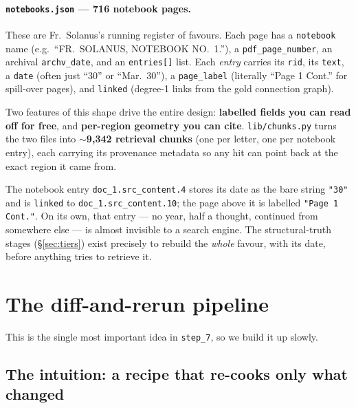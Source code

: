 \documentclass[11pt]{article}
\newcommand{\code}[1]{\texttt{#1}}
\begin{document}
\paragraph{\code{notebooks.json} --- 716 notebook pages.} These are Fr.\ Solanus's running register of
favours. Each page has a \code{notebook} name (e.g.\ ``FR.\ SOLANUS, NOTEBOOK NO.\ 1.''), a
\code{pdf\_page\_number}, an archival \code{archv\_date}, and an \code{entries[]} list. Each
\emph{entry} carries its \code{rid}, its \code{text}, a \code{date} (often just ``30'' or
``Mar.\ 30''), a \code{page\_label} (literally ``Page 1 Cont.'' for spill-over pages), and
\code{linked} (degree-1 links from the gold connection graph).

Two features of this shape drive the entire design: \textbf{labelled fields you can read off for
free}, and \textbf{per-region geometry you can cite}. \code{lib/chunks.py} turns the two files into
$\sim$\textbf{9{,}342 retrieval chunks} (one per letter, one per notebook entry), each carrying its
provenance metadata so any hit can point back at the exact region it came from.

\begin{tcolorbox}[colback=gray!5, colframe=gray!50!black, sharp corners, boxrule=0.5pt,
                  title=\bfseries A concrete entry that explains why half the pipeline exists]
The notebook entry \code{doc\_1.src\_content.4} stores its date as the bare string \code{"30"} and is
\code{linked} to \code{doc\_1.src\_content.10}; the page above it is labelled \code{"Page 1 Cont."}.
On its own, that entry --- no year, half a thought, continued from somewhere else --- is almost
invisible to a search engine. The structural-truth stages (\S\ref{sec:tiers}) exist precisely to
rebuild the \emph{whole} favour, with its date, before anything tries to retrieve it.
\end{tcolorbox}

\section{The diff-and-rerun pipeline}\label{sec:pipeline}

This is the single most important idea in \code{step\_7}, so we build it up slowly.

\subsection{The intuition: a recipe that re-cooks only what changed}
\end{document}
